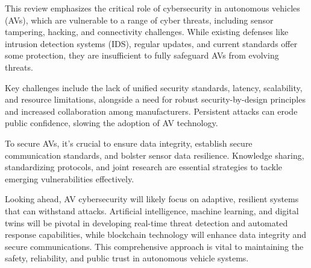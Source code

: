 This review emphasizes the critical role of cybersecurity in autonomous vehicles (AVs), which are vulnerable to a range of cyber threats, including sensor tampering, hacking, and connectivity challenges.
While existing defenses like intrusion detection systems (IDS), regular updates, and current standards offer some protection, they are insufficient to fully safeguard AVs from evolving threats.

Key challenges include the lack of unified security standards, latency, scalability, and resource limitations, alongside a need for robust security-by-design principles and increased collaboration among manufacturers.
Persistent attacks can erode public confidence, slowing the adoption of AV technology.

To secure AVs, it's crucial to ensure data integrity, establish secure communication standards, and bolster sensor data resilience.
Knowledge sharing, standardizing protocols, and joint research are essential strategies to tackle emerging vulnerabilities effectively.

Looking ahead, AV cybersecurity will likely focus on adaptive, resilient systems that can withstand attacks.
Artificial intelligence, machine learning, and digital twins will be pivotal in developing real-time threat detection and automated response capabilities,
while blockchain technology will enhance data integrity and secure communications.
This comprehensive approach is vital to maintaining the safety, reliability, and public trust in autonomous vehicle systems.